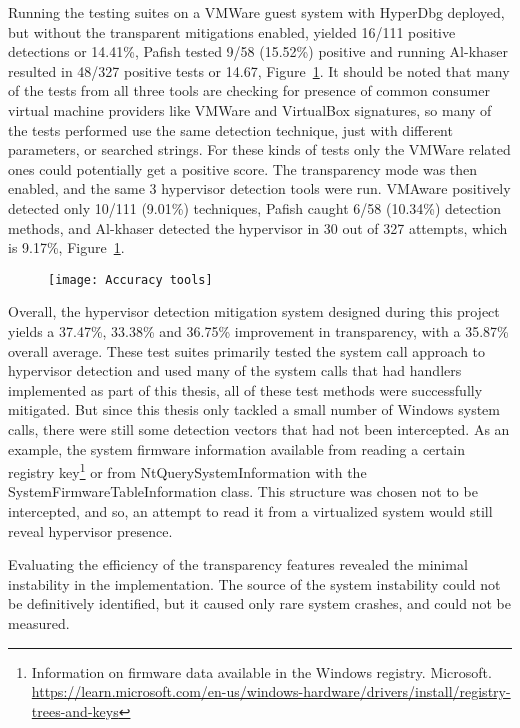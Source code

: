 Running the testing suites on a VMWare guest system with HyperDbg deployed, but without the transparent mitigations enabled, yielded 16/111 positive detections or 14.41\%, 
Pafish tested 9/58 (15.52\%) positive and running Al-khaser resulted in 48/327 positive tests or 14.67, Figure~\ref{fig:test_accuracy}.
It should be noted that many of the tests from all three tools are checking for presence of common consumer virtual machine providers like VMWare and VirtualBox signatures, 
so many of the tests performed use the same detection technique, just with different parameters, or searched strings. For these kinds of tests only the VMWare related ones could potentially get a positive score. 
The transparency mode was then enabled, and the same 3 hypervisor detection tools were run. VMAware positively detected only 10/111 (9.01\%) techniques, Pafish caught 6/58 (10.34\%) detection methods, and 
Al-khaser detected the hypervisor in 30 out of 327 attempts, which is 9.17\%, Figure~\ref{fig:test_accuracy}.
\begin{figure}[tbp]
    \texttt{[image: Accuracy tools]} %
    \label{fig:test_accuracy}
\end{figure}

Overall, the hypervisor detection mitigation system designed during this project yields a 37.47\%, 33.38\% and 36.75\% improvement in transparency, 
with a 35.87\% overall average. These test suites primarily tested the system call approach to hypervisor detection and used many of the system calls that had handlers implemented as part of this thesis, 
all of these test methods were successfully mitigated. But since this thesis only tackled a small number of Windows system calls, there were still some detection vectors that had not been intercepted. 
As an example, the system firmware information available from reading a certain registry key\footnote{Information on firmware data available in the Windows registry. Microsoft. \url{https://learn.microsoft.com/en-us/windows-hardware/drivers/install/registry-trees-and-keys}} 
or from NtQuerySystemInformation with the SystemFirmwareTableInformation class. This structure was chosen not to be intercepted, and so, 
an attempt to read it from a virtualized system would still reveal hypervisor presence.

Evaluating the efficiency of the transparency features revealed the minimal instability in the implementation. The source of the system instability 
could not be definitively identified, but it caused only rare system crashes, and could not be measured.


